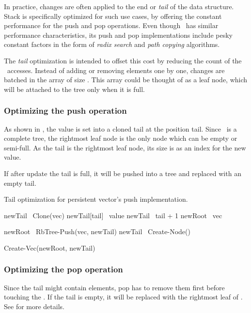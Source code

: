 In practice, changes are often applied to the end or \emph{tail} of the data structure. Stack is specifically optimized for such use cases, by offering the constant performance for the push and pop operations. Even though \rbtree\ has similar performance characteristics, its push and pop implementations include pesky constant factors in the form of \emph{radix search} and \emph{path copying} algorithms.

The \emph{tail} optimization is intended to offset this cost by reducing the count of the \rbtree\ accesses. Instead of adding or removing elements one by one, changes are batched in the array of size \m. This array could be thought of as a leaf node, which will be attached to the tree only when it is full.

\subsubsection*{Optimizing the push operation}
As shown in , the value is set into a cloned tail at the position tail. Since \rbtree\ is a complete tree, the rightmost leaf node is the only node which can be empty or semi-full. As the tail is the rightmost leaf node, its size is as an index for the new value.

If after update the tail is full, it will be pushed into a tree and replaced with an empty tail.

\begin{listing}[ht!]
    \caption{Tail optimization for persistent vector’s push implementation.}
    \label{lst:pvec-push}

    \begin{algorithmic}
        \State newTail \la\ Clone(vec)
        \State newTail[tail] \la\ value
        \State newTail \la\ tail + 1
        \State newRoot \la\ vec

            \State newRoot \la\ RbTree-Push(vec, newTail)
            \State newTail \la\ Create-Node()
        \EndIf

        \State \Return Create-Vec(newRoot, newTail)
        \EndFunction
    \end{algorithmic}
\end{listing}

\subsubsection*{Optimizing the pop operation}
Since the tail might contain elements, pop has to remove them first before touching the \rbtree. If the tail is empty, it will be replaced with the rightmost leaf of \rbtree. See  for more details.

